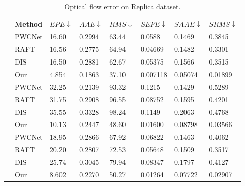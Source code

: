 \begin{table}[h!]
	\centering
	\caption{\label{tab:exp:oferrorquality}%
		Optical flow error on Replica dataset.}
	\begin{tabular}{p{0.2cm}p{1.6cm}p{1.2cm}p{1.2cm}p{1.2cm}p{1.2cm}p{1.2cm}p{1.2cm}}
		\hline
		  &  Method & ${EPE}\downarrow$ & $AAE\downarrow$ & $RMS\downarrow$ & $SEPE\downarrow$ & ${SAAE}\downarrow$ & ${SRMS}\downarrow$ \\
		\hline
		\multirow{3}{*}{\rotatebox[origin=c]{90}{Circle}} & PWCNet & 16.60 & 0.2994  & 63.44  & 0.0588 & 0.1469 & 0.3845 \\ 
		 & RAFT & 16.56 & 0.2775  & 64.94 & 0.04669 & 0.1482 & 0.3301 \\
		 & DIS  & 16.50  & 0.2881  & 62.67  & 0.05375 &  0.1566 & 0.3515 \\
		 & Our & {4.854} & {0.1863}  & 37.10 & 0.007118 & 0.05074 & 0.01899 \\ 
		\hline
		\multirow{3}{*}{\rotatebox[origin=c]{90}{Line}} & PWCNet & 32.25 & 0.2139  & 93.32 & 0.1215 & 0.1429 & 0.5289 \\ 
		& RAFT & 31.75 & 0.2908 & 96.55 & 0.08752 & 0.1595 & 0.4201 \\ 
		& DIS  & 35.55 & 0.3328 & 98.24 & 0.1149 & 0.2063 &  0.4768 \\
		& Our & 10.13 & 0.2447  & 48.60 & 0.01600 & 0.08798 & 0.03566 \\
		\hline
		\multirow{4}{*}{\rotatebox[origin=c]{90}{All}} 
		& PWCNet & 18.95 & 0.2866  & 67.92 & 0.06822 & 0.1463 & 0.4062 \\
		& RAFT & 20.20 & 0.2807  & 72.53  & 0.05648 & 0.1509  & 0.3517 \\
		& DIS  & 25.74  & 0.3045  & 79.94  & 0.08347 & 0.1797  & 0.4127 \\
		& Our & 8.602 & 0.2270  & 50.27 & 0.01264 & 0.07722 & 0.02907 \\
		\hline
	\end{tabular}
\end{table}




